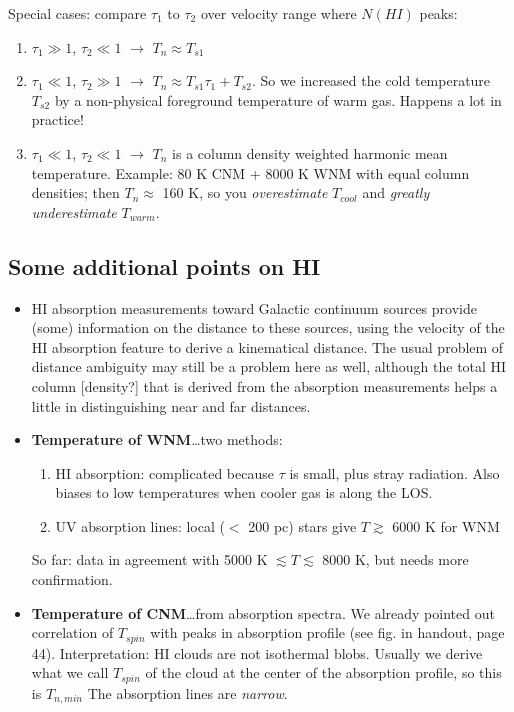 \documentclass[12pt]{article}
\newcommand{\mar}[1]{\hspace{0pt}\marginpar{-\textcolor{black}{#1}-}}
\newcommand{\mynotes}[1]{\textcolor{mygreen}{#1}}
\begin{document}
Special cases: \mynotes{compare $\tau_{1}$ to $\tau_{2}$ over velocity range
where $N(HI)$ peaks}:
\begin{enumerate}
    \item $\tau_{1} \gg 1$, $\tau_{2} \ll 1$ $\rightarrow$ $T_{n} \approx T_{s1}$
    \item $\tau_{1} \ll 1$, $\tau_{2} \gg 1$ $\rightarrow$
        $T_{n} \approx T_{s1}\tau_{1} + T_{s2}$. So we increased the cold
        temperature $T_{s2}$ by a non-physical foreground temperature of warm
        gas. Happens a lot in practice!
    \item $\tau_{1} \ll 1$, $\tau_{2} \ll 1$ $\rightarrow$ $T_{n}$ is a
        column density weighted harmonic mean temperature. Example: 80 K CNM +
        8000 K WNM with equal column densities; then $T_{n} \approx$ 160 K,
        so you \emph{overestimate} $T_{cool}$ and \emph{greatly underestimate}
        $T_{warm}$.
\end{enumerate}

\subsection{Some additional points on HI}
\mar{49}
\begin{itemize}
    \item HI absorption measurements toward Galactic continuum sources provide (some)
        information on the distance to these sources, using the velocity of the HI
        absorption feature to derive a kinematical distance. The usual problem of
        distance ambiguity may still be a problem here as well, although the total
        HI column [density?] that is derived from the absorption measurements helps
        a little in distinguishing near and far distances.
    \item \textbf{Temperature of WNM}\ldots two methods:
        \begin{enumerate}
            \item HI absorption: complicated because $\tau$ is small, plus stray
                radiation. Also biases to low temperatures when cooler gas is
                along the LOS\@.
            \item UV absorption lines: local ($<$ 200 pc) stars give
            $T \gtrsim$ 6000 K for WNM
        \end{enumerate}
        So far: data in agreement with 5000 K $\lesssim T \lesssim$ 8000 K,
        but needs more confirmation.
    \item \textbf{Temperature of CNM}\ldots from absorption spectra.
        We already pointed out correlation of $T_{spin}$ with peaks in
        absorption profile (see fig. in handout, page 44). Interpretation: HI
        clouds are not isothermal blobs. Usually we derive what we call
        $T_{spin}$ of the cloud at the center of the absorption profile, so this
        is $T_{n, min}$
        \mar{50}The absorption lines are \emph{narrow}.
\end{itemize}
\end{document}
